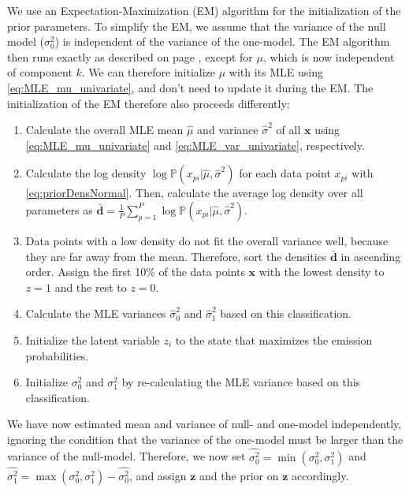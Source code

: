 \documentclass[a4paper,11pt]{article}
\def\x{\boldsymbol{x}}
\def\z{\boldsymbol{z}}
\def\p{\mathbb{P}}
\begin{document}
We use an Expectation-Maximization (EM) algorithm for the initialization of the prior parameters. To simplify the EM, we assume that the variance of the null model ($\sigma_0^2$) is independent of the variance of the one-model. The EM algorithm then runs exactly as described on page \pageref{pg:EM_univariate}, except for $\mu$, which is now independent of component $k$. We can therefore initialize $\mu$ with its MLE using \eqref{eq:MLE_mu_univariate}, and don't need to update it during the EM. The initialization of the EM therefore also proceeds differently:
\begin{enumerate}
    \item Calculate the overall MLE mean $\hat \mu$ and variance $\hat \sigma^2$ of all $\x$ using \eqref{eq:MLE_mu_univariate} and \eqref{eq:MLE_var_univariate}, respectively.
    \item Calculate the log density $\log \p(x_{pi}|\hat \mu, \hat \sigma^2)$ for each data point $x_{pi}$ with \eqref{eq:priorDensNormal}. Then, calculate the average log density over all parameters as $\bar{\boldsymbol d} = \frac{1}{P}\sum_{p=1}^P \log \p(x_{pi}|\hat \mu, \hat \sigma^2)$.
    \item Data points with a low density do not fit the overall variance well, because they are far away from the mean. Therefore, sort the densities $\bar{\boldsymbol d}$ in ascending order. Assign the first 10\% of the data points $\x$ with the lowest density to $z=1$ and the rest to $z=0$.
    \item Calculate the MLE variances $\hat \sigma_0^2$ and $\hat \sigma_1^2$ based on this classification.
    \item Initialize the latent variable $z_i$ to the state that maximizes the emission probabilities.
    \item Initialize $\sigma_0^2$ and $\sigma_1^2$ by re-calculating the MLE variance based on this classification.
\end{enumerate}

We have now estimated mean and variance of null- and one-model independently, ignoring the condition that the variance of the one-model must be larger than the variance of the null-model. Therefore, we now set $\hat{\sigma_0^2} = \min(\sigma_0^2, \sigma_1^2)$ and $\hat{\sigma_1^2} = \max(\sigma_0^2, \sigma_1^2) - \hat{\sigma_0^2}$, and assign $\z$ and the prior on $\z$ accordingly.
\end{document}
